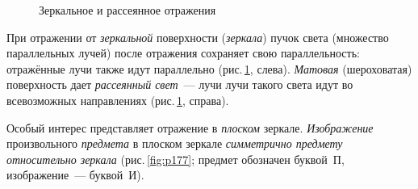 \documentclass[main.tex]{subfiles}
\begin{document}
\begin{figure}[H]
\caption{Зеркальное и рассеянное отражения}
\label{fig:p176}
\end{figure}

При отражении от \emph{зеркальной} поверхности (\emph{зеркала}) пучок света (множество параллельных лучей) после отражения сохраняет свою параллельность: отражённые лучи также идут параллельно (рис.\,\ref{fig:p176}, слева). \emph{Матовая} (шероховатая) поверхность дает \emph{рассеянный свет}~--- лучи лучи такого света идут во всевозможных направлениях (рис.\,\ref{fig:p176}, справа). 

Особый интерес представляет отражение в \emph{плоском} зеркале. \emph{Изображение} произвольного \emph{предмета} в плоском зеркале \emph{симметрично предмету относительно зеркала} (рис.\,\ref{fig:p177}; предмет обозначен буквой~П, изображение~--- буквой~И).
\end{document}
